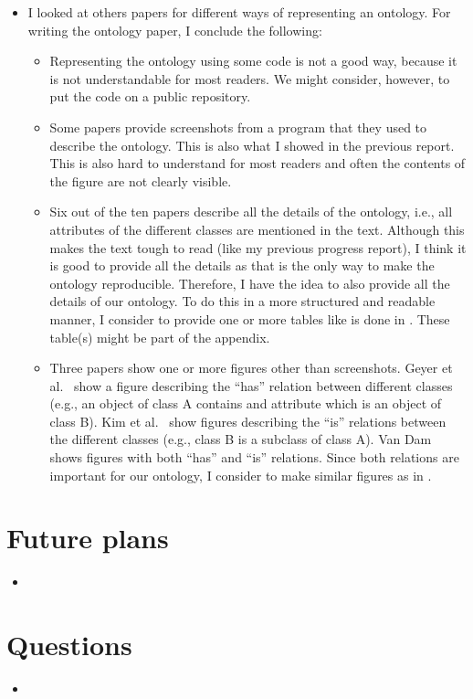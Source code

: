 \documentclass[10pt,final,a4paper,oneside,onecolumn]{article}
\begin{document}
\begin{itemize}
	\item I looked at others papers for different ways of representing an ontology. For writing the ontology paper, I conclude the following:
	\begin{itemize}
		\item Representing the ontology using some code \cite{chen2004soupa, chen2003ontology} is not a good way, because it is not understandable for most readers. We might consider, however, to put the code on a public repository.
		\item Some papers \cite{gkoutos2004mouse, lee2017location, matsokis2010plm} provide screenshots from a program that they used to describe the ontology. This is also what I showed in the previous report. This is also hard to understand for most readers and often the contents of the figure are not clearly visible. 
		\item Six \cite{kim2005security, chen2004soupa, chen2003ontology, golemati2007creating, matsokis2010plm, vanDamPhDThesis2009} out of the ten papers describe all the details of the ontology, i.e., all attributes of the different classes are mentioned in the text. Although this makes the text tough to read (like my previous progress report), I think it is good to provide all the details as that is the only way to make the ontology reproducible. Therefore, I have the idea to also provide all the details of our ontology. To do this in a more structured and readable manner, I consider to provide one or more tables like is done in \cite{golemati2007creating}. These table(s) might be part of the appendix.
		\item Three papers show one or more figures other than screenshots. Geyer et al.\ \cite{geyer2014} show a figure describing the ``has'' relation between different classes (e.g., an object of class A contains and attribute which is an object of class B). Kim et al.\ \cite{kim2005security} show figures describing the ``is'' relations between the different classes (e.g., class B is a subclass of class A). Van Dam \cite{vanDamPhDThesis2009} shows figures with both ``has'' and ``is'' relations. Since both relations are important for our ontology, I consider to make similar figures as in \cite{vanDamPhDThesis2009}. 
	\end{itemize}
\end{itemize}

\section{Future plans}

\begin{itemize}
	\item 
\end{itemize}

\section{Questions}

\begin{itemize}
	\item 
\end{itemize}


\printbibliography
\end{document}
